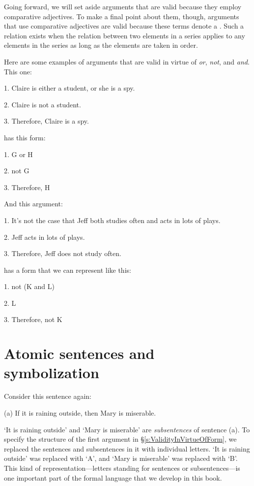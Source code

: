 \begin{notebox}
Going forward, we will set aside arguments that are valid because they employ comparative adjectives. To make a final point about them, though, arguments that use comparative adjectives are valid because these terms denote a . Such a relation exists when the relation between two elements in a series applies to any elements in the series as long as the elements are taken in order. 
\end{notebox}

Here are some examples of arguments that are valid in virtue of \textit{or}, \textit{not}, and \textit{and}.
This one:
	\begin{earg}
		\item[1.] Claire is either a student, or she is a spy.
		\item[2.] Claire is not a student.
		\item[3.] Therefore, Claire is a spy.
	\end{earg}
has this form:
	\begin{earg}
		\item[1.] G or H
		\item[2.] not G
		\item[3.] Therefore, H
	\end{earg}
And this argument:
	\begin{earg}
		\item[1.] It's not the case that Jeff both studies often and acts in lots of plays.
		\item[2.] Jeff acts in lots of plays.
		\item[3.] Therefore, Jeff does not study often.
	\end{earg}
has a form that we can represent like this:
	\begin{earg}
		\item[1.] not (K and L)
		\item[2.] L
		\item[3.] Therefore, not K
	\end{earg}


\section{Atomic sentences and symbolization}\label{s:atomic}

Consider this sentence again:
	\begin{earg}
		\item[(a)] If it is raining outside, then Mary is miserable.
	\end{earg}
`It is raining outside' and `Mary is miserable' are \textit{subsentences} of sentence (a). To specify the structure of the first argument in \S\ref{s:ValidityInVirtueOfForm}, we replaced the sentences and subsentences in it with individual letters. `It is raining outside' was replaced with `A', and `Mary is miserable' was replaced with `B'. This kind of representation---letters standing for sentences or subsentences---is one important part of the formal language that we develop in this book.


